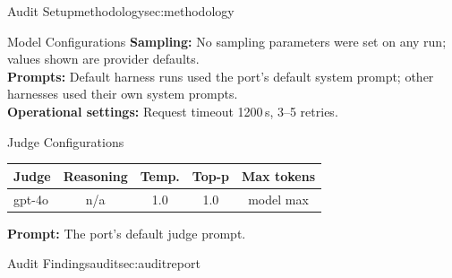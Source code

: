 \begin{maincontentstyled}
\begin{reportpart}{Audit Setup}{methodology}{sec:methodology}
\begin{dsbox}[top=1mm, bottom=1mm, before skip=3pt, after skip=3pt]{Model Configurations}
{\small \textbf{Sampling:} No sampling parameters were set on
  any run; values shown are provider defaults. \\
  \textbf{Prompts:} Default harness runs used the port's default
  system prompt; other harnesses used their own system prompts. \\
  \textbf{Operational settings:} Request timeout 1200\,s, 3--5 retries.}
\end{dsbox}

\noindent
\begin{dsbox}[top=1mm, bottom=1mm, before skip=3pt, after skip=3pt]{Judge Configurations}
\renewcommand{\arraystretch}{1.1}%
\small
\noindent\begin{tabularx}{\linewidth}{|L{1.4}|C{1.0}|C{0.7}|C{0.7}|C{1.2}|}
\hline
\textbf{Judge} & \textbf{Reasoning} & \textbf{Temp.} & \textbf{Top-p} & \textbf{Max tokens} \\
\hline
%
gpt-4o & n/a & 1.0 & 1.0 & model max \\ \hline
\end{tabularx}
\smallskip

{\small \textbf{Prompt:} The port's default judge prompt.}
\end{dsbox}


\end{reportpart}

\begin{reportpart}{Audit Findings}{audit}{sec:auditreport}


\end{reportpart}
\end{maincontentstyled}
